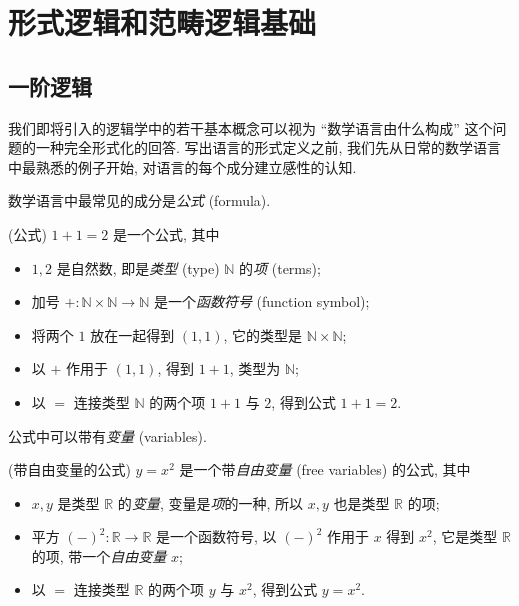 \chapter{形式逻辑和范畴逻辑基础}

\label{logic-appendix}

\minitoc


\section{一阶逻辑}

\label{first-order-languages}

我们即将引入的逻辑学中的若干基本概念可以视为 ``数学语言由什么构成'' 这个问题的一种完全形式化的回答. 写出语言的形式定义之前, 我们先从日常的数学语言中最熟悉的例子开始, 对语言的每个成分建立感性的认知.


数学语言中最常见的成分是\emph{公式} (formula).

\begin{example}
	{(公式)}
	$1+1=2$ 是一个公式, 其中
	\begin{itemize}
		\item $1,2$ 是自然数, 即是\emph{类型} (type) $\mathbb{N}$ 的\emph{项} (terms);
		\item 加号 $+ \colon \mathbb{N}\times\mathbb{N} \to \mathbb{N}$ 是一个\emph{函数符号} (function symbol);
		\item 将两个 $1$ 放在一起得到 $(1,1)$, 它的类型是 $\mathbb{N}\times\mathbb{N}$;
		\item 以 $+$ 作用于 $(1,1)$, 得到 $1+1$, 类型为 $\mathbb{N}$;
		\item 以 $=$ 连接类型 $\mathbb{N}$ 的两个项 $1+1$ 与 $2$, 得到公式 $1+1=2$. %
	\end{itemize}
\end{example}

公式中可以带有\emph{变量} (variables).

\begin{example}
	{(带自由变量的公式)}
	$y=x^2$ 是一个带\emph{自由变量} (free variables) 的公式, 其中
	\begin{itemize}
		\item $x,y$ 是类型 $\mathbb{R}$ 的\emph{变量}, 变量是\emph{项}的一种, 所以 $x,y$ 也是类型 $\mathbb{R}$ 的项;
		\item 平方 $(-)^2 \colon \mathbb{R} \to \mathbb{R}$ 是一个函数符号, 以 $(-)^2$ 作用于 $x$ 得到 $x^2$, 它是类型 $\mathbb{R}$ 的项, 带一个\emph{自由变量} $x$;
		\item 以 $=$ 连接类型 $\mathbb{R}$ 的两个项 $y$ 与 $x^2$, 得到公式 $y=x^2$. %
	\end{itemize}
\end{example}

